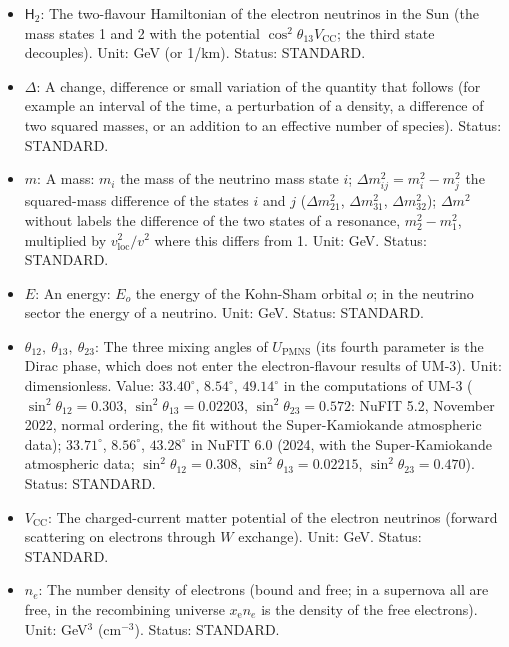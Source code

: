 \documentclass[
  10pt,
]{article}
\providecommand{\tightlist}{%
  \setlength{\itemsep}{0pt}\setlength{\parskip}{0pt}}
\begin{document}
\begin{itemize}
\tightlist
\item
  \(\mathsf{H}_{2}\): The two-flavour Hamiltonian of the electron
  neutrinos in the Sun (the mass states 1 and 2 with the potential
  \(\cos^2\theta_{13}V_{\mathrm{CC}}\); the third state decouples).
  Unit: GeV (or 1/km). Status: STANDARD.
\item
  \(\Delta\): A change, difference or small variation of the quantity
  that follows (for example an interval of the time, a perturbation of a
  density, a difference of two squared masses, or an addition to an
  effective number of species). Status: STANDARD.
\item
  \(m\): A mass: \(m_i\) the mass of the neutrino mass state \(i\);
  \(\Delta m_{ij}^2 = m_i^2 - m_j^2\) the squared-mass difference of the
  states \(i\) and \(j\) (\(\Delta m_{21}^2\), \(\Delta m_{31}^2\),
  \(\Delta m_{32}^2\)); \(\Delta m^2\) without labels the difference of
  the two states of a resonance, \(m_2^2 - m_1^2\), multiplied by
  \(v_{\mathrm{loc}}^2/v^2\) where this differs from 1. Unit: GeV.
  Status: STANDARD.
\item
  \(E\): An energy: \(E_o\) the energy of the Kohn-Sham orbital \(o\);
  in the neutrino sector the energy of a neutrino. Unit: GeV. Status:
  STANDARD.
\item
  \(\theta_{12},\ \theta_{13},\ \theta_{23}\): The three mixing angles
  of \(U_{\mathrm{PMNS}}\) (its fourth parameter is the Dirac phase,
  which does not enter the electron-flavour results of UM-3). Unit:
  dimensionless. Value: \(33.40^\circ\), \(8.54^\circ\), \(49.14^\circ\)
  in the computations of UM-3 (\(\sin^2\theta_{12} = 0.303\),
  \(\sin^2\theta_{13} = 0.02203\), \(\sin^2\theta_{23} = 0.572\): NuFIT
  5.2, November 2022, normal ordering, the fit without the
  Super-Kamiokande atmospheric data); \(33.71^\circ\), \(8.56^\circ\),
  \(43.28^\circ\) in NuFIT 6.0 (2024, with the Super-Kamiokande
  atmospheric data; \(\sin^2\theta_{12} = 0.308\),
  \(\sin^2\theta_{13} = 0.02215\), \(\sin^2\theta_{23} = 0.470\)).
  Status: STANDARD.
\item
  \(V_{\mathrm{CC}}\): The charged-current matter potential of the
  electron neutrinos (forward scattering on electrons through \(W\)
  exchange). Unit: GeV. Status: STANDARD.
\item
  \(n_e\): The number density of electrons (bound and free; in a
  supernova all are free, in the recombining universe
  \(x_{\mathrm{e}}n_e\) is the density of the free electrons). Unit:
  GeV\(^3\) (cm\(^{-3}\)). Status: STANDARD.

\end{itemize}
\end{document}
